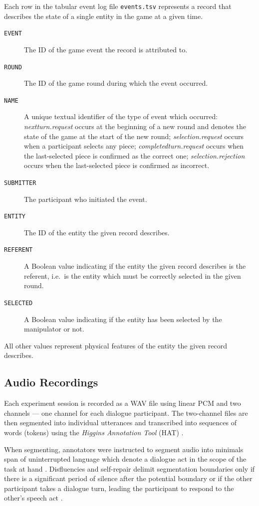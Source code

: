 \documentclass[USenglish]{article}
\newcommand{\scare}[1]{\textquote{#1}}	%
\newcommand{\inlinecode}[1]{\texttt{#1}}	%
\begin{document}
Each row in the tabular event log file \inlinecode{events.tsv} represents a record that describes the state of a single entity in the game at a given time.

\begin{description}
	\item[\inlinecode{EVENT}] The ID of the game event the record is attributed to.
	\item[\inlinecode{ROUND}] The ID of the game round during which the event occurred.
	\item[\inlinecode{NAME}] A unique textual identifier of the type of event which occurred: \emph{nextturn.request} occurs at the beginning of a new round and denotes the state of the game at the start of the new round; \emph{selection.request} occurs when a participant selects any piece; \emph{completedturn.request} occurs when the last-selected piece is confirmed as the correct one; \emph{selection.rejection} occurs when the last-selected piece is confirmed as incorrect.
	\item[\inlinecode{SUBMITTER}] The participant who initiated the event.
	\item[\inlinecode{ENTITY}] The ID of the entity the given record describes. 
	\item[\inlinecode{REFERENT}] A Boolean value indicating if the entity the given record describes is the \scare{target} referent, i.e.\ is the entity which must be correctly selected in the given round.
	\item[\inlinecode{SELECTED}] A Boolean value indicating if the entity has been selected by the manipulator or not.
\end{description}

All other values represent physical features of the entity the given record describes.

\subsection{Audio Recordings}

Each experiment session is recorded as a WAV file using linear PCM and two channels --- one channel for each dialogue participant. The two-channel files are then segmented into individual utterances and transcribed into sequences of words (tokens) using the \emph{Higgins Annotation Tool} (HAT) \autocite{HAT}.

When segmenting, annotators were instructed to segment audio into minimals span of uninterrupted language which denote a dialogue act in the scope of the task at hand \autocite[cf.][]{Stolcke&al:2000}. Disfluencies and self-repair delimit segmentation boundaries only if there is a significant period of silence after the potential boundary or if the other participant takes a dialogue turn, leading the participant to respond to the other's speech act \autocite[cf.][]{Schegloff:2000}.
\end{document}
